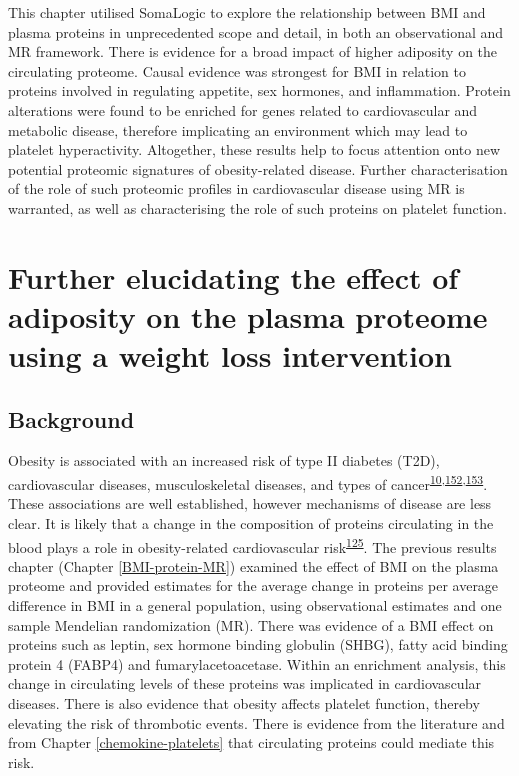 \documentclass[11pt,twoside]{bristolthesis}
\begin{document}
This chapter utilised SomaLogic to explore the relationship between BMI and plasma proteins in unprecedented scope and detail, in both an observational and MR framework. There is evidence for a broad impact of higher adiposity on the circulating proteome. Causal evidence was strongest for BMI in relation to proteins involved in regulating appetite, sex hormones, and inflammation. Protein alterations were found to be enriched for genes related to cardiovascular and metabolic disease, therefore implicating an environment which may lead to platelet hyperactivity. Altogether, these results help to focus attention onto new potential proteomic signatures of obesity-related disease. Further characterisation of the role of such proteomic profiles in cardiovascular disease using MR is warranted, as well as characterising the role of such proteins on platelet function.

\hypertarget{BMI-protein-RCT}{%
\chapter{Further elucidating the effect of adiposity on the plasma proteome using a weight loss intervention}\label{BMI-protein-RCT}}

\hypertarget{background-4}{%
\section{Background}\label{background-4}}

Obesity is associated with an increased risk of type II diabetes (T2D), cardiovascular diseases, musculoskeletal diseases, and types of cancer\textsuperscript{\protect\hyperlink{ref-Khan2018}{10},\protect\hyperlink{ref-Garg2014}{152},\protect\hyperlink{ref-Kortt2002}{153}}. These associations are well established, however mechanisms of disease are less clear. It is likely that a change in the composition of proteins circulating in the blood plays a role in obesity-related cardiovascular risk\textsuperscript{\protect\hyperlink{ref-Goudswaard2021}{125}}. The previous results chapter (Chapter \ref{BMI-protein-MR}) examined the effect of BMI on the plasma proteome and provided estimates for the average change in proteins per average difference in BMI in a general population, using observational estimates and one sample Mendelian randomization (MR). There was evidence of a BMI effect on proteins such as leptin, sex hormone binding globulin (SHBG), fatty acid binding protein 4 (FABP4) and fumarylacetoacetase. Within an enrichment analysis, this change in circulating levels of these proteins was implicated in cardiovascular diseases. There is also evidence that obesity affects platelet function, thereby elevating the risk of thrombotic events. There is evidence from the literature and from Chapter \ref{chemokine-platelets} that circulating proteins could mediate this risk.
\end{document}
